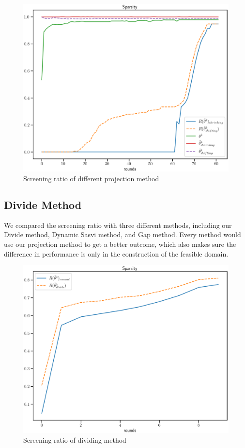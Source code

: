 \documentclass[twoside]{article}
\theoremstyle{plain}
\begin{document}
	\begin{figure}[htbp]
	\begin{center}	
	\includegraphics[width = \linewidth]{pic/sparse_proj}
	\caption{Screening ratio of different projection method}
	\end{center}	
	\end{figure}

\subsection{Divide Method}
We compared the screening ratio with three different methods, including our Divide method, Dynamic Sasvi method, and Gap method. Every method would use our projection method to get a better outcome, which also makes sure the difference in performance is only in the construction of the feasible domain. 
	\begin{figure}[h]
	\begin{center}	
	\includegraphics[width = \linewidth]{pic/screening_divide_ratio_long}
	\caption{Screening ratio of dividing method}
	\end{center}	
	\end{figure}
\end{document}
